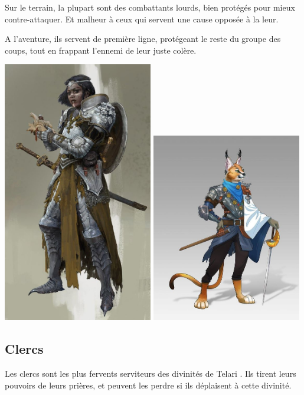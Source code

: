 \documentclass[10pt,a4paper]{book}
\newcommand{\nomorigine}{Telari }
\begin{document}
Sur le terrain, la plupart sont des combattants lourds, bien protégés pour mieux contre-attaquer. Et malheur à ceux qui servent une cause opposée à la leur.

A l'aventure, ils servent de première ligne, protégeant le reste du groupe des coups, tout en frappant l'ennemi de leur juste colère.

\includegraphics[width=0.49\textwidth]{paladin 1}
\includegraphics[width=0.49\textwidth]{paladin 2}
\subsection{Clercs}
Les clercs sont les plus fervents serviteurs des divinités de \nomorigine. Ils tirent leurs pouvoirs de leurs prières, et peuvent les perdre si ils déplaisent à cette divinité.
\end{document}
